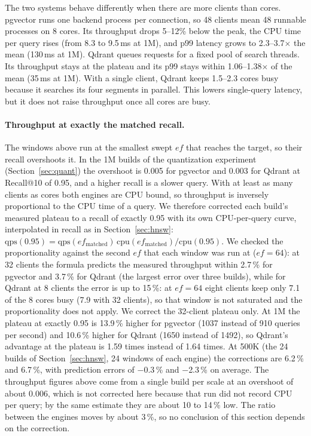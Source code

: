 \documentclass[preprint,12pt]{elsarticle}
\begin{document}
The two systems behave differently when there are more clients than cores. pgvector
runs one backend process per connection, so 48 clients mean 48 runnable processes on
8 cores. Its throughput drops 5--12\% below the peak, the CPU time per query rises (from
8.3 to 9.5\,ms at 1M), and p99 latency grows to 2.3--3.7$\times$ the mean (130\,ms at
1M). Qdrant queues requests for a fixed pool of search threads. Its throughput stays at
the plateau and its p99 stays within 1.06--1.38$\times$ of the mean (35\,ms at 1M). With
a single client, Qdrant keeps 1.5--2.3 cores busy because it searches its four segments
in parallel. This lowers single-query latency, but it does not raise throughput once all
cores are busy.

\paragraph{Throughput at exactly the matched recall.} The windows above run at the smallest swept $ef$ that reaches the target, so
their recall overshoots it. In the 1M builds of the quantization experiment (Section~\ref{sec:quant}) the overshoot is 0.005 for pgvector and
0.003 for Qdrant at Recall@10 of 0.95, and a higher recall is a slower query. With at least as many clients as cores both engines are CPU bound,
so throughput is inversely proportional to the CPU time of a query. We therefore corrected each build's measured plateau to a recall of exactly 0.95
with its own CPU-per-query curve, interpolated in recall as in Section~\ref{sec:hnsw}:
$\mathrm{qps}(0.95)=\mathrm{qps}(ef_{\mathrm{matched}})\,\mathrm{cpu}(ef_{\mathrm{matched}})/\mathrm{cpu}(0.95)$.
We checked the proportionality against the second $ef$ that each window was run at ($ef=64$): at 32 clients the formula predicts the measured throughput
within 2.7\,\% for pgvector and 3.7\,\% for Qdrant (the largest error over three builds), while for Qdrant at 8 clients the error is up to 15\,\%: at $ef=64$ eight clients keep only 7.1 of the 8 cores busy (7.9 with 32 clients), so that window is not
saturated and the proportionality does not apply. We correct the 32-client plateau only. At 1M the plateau at exactly 0.95 is 13.9\,\% higher for pgvector (1037 instead of 910 queries per
second) and 10.6\,\% higher for Qdrant (1650 instead of 1492), so Qdrant's advantage at the plateau is 1.59 times instead of 1.64 times. At 500K (the 24 builds of
Section~\ref{sec:hnsw}, 24 windows of each engine) the corrections are 6.2\,\% and 6.7\,\%, with prediction errors of $-$0.3\,\% and $-$2.3\,\% on average. The throughput figures above
come from a single build per scale at an overshoot of about 0.006, which is not corrected here because that run did not record CPU per query; by the same
estimate they are about 10 to 14\,\% low. The ratio between the engines moves by about 3\,\%, so no conclusion of this section depends on the correction.
\end{document}

